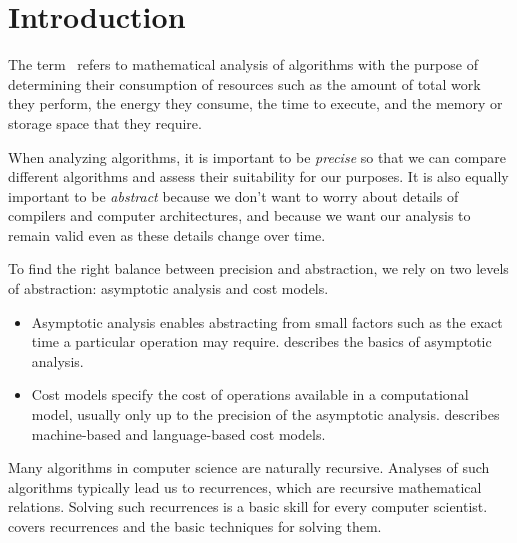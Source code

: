 \chapter{Introduction}
\label{ch:analysis::introduction}

\begin{gram}
The term~ refers to mathematical analysis of
algorithms with the purpose of determining their consumption of
resources such as the amount of total work they perform, the energy
they consume, the time to execute, and the memory or storage space
that they require.
%

When analyzing algorithms, it is important to be \emph{precise} so
that we can compare different algorithms and assess their suitability for
our purposes.
%
It is also equally important to be \emph{abstract} because we don't
want to worry about details of compilers and computer architectures,
and because we want our analysis to remain valid even as these details
change over time.

To find the right balance between precision and abstraction, we rely
on two levels of abstraction: asymptotic analysis and cost models.
%
\begin{itemize}
\item Asymptotic analysis enables abstracting from small factors such as the
exact time a particular operation may require. 
%
 describes the basics of asymptotic
analysis.

\item Cost models specify the cost of operations available in a
  computational model, usually only up to the precision of the
  asymptotic analysis.   describes
  machine-based and language-based cost models.
\end{itemize}

Many algorithms in computer science are naturally recursive.  
%
Analyses of such algorithms typically lead us to recurrences, which
are recursive mathematical relations.
%
Solving such recurrences is a basic skill for every computer
scientist.
%
 covers recurrences and the basic
techniques for solving them.

\end{gram}
